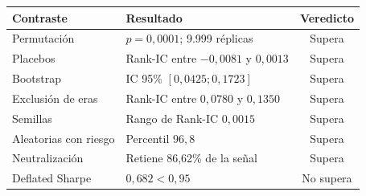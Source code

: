 \begin{tabular}{llc}
\toprule
Contraste & Resultado & Veredicto \\
\midrule
Permutación & $p=0,0001$; 9.999 réplicas & Supera \\
Placebos & Rank-IC entre $-0,0081$ y $0,0013$ & Supera \\
Bootstrap & IC 95\% $[0,0425; 0,1723]$ & Supera \\
Exclusión de eras & Rank-IC entre $0,0780$ y $0,1350$ & Supera \\
Semillas & Rango de Rank-IC $0,0015$ & Supera \\
Aleatorias con riesgo & Percentil $96,8$ & Supera \\
Neutralización & Retiene 86,62\% de la señal & Supera \\
Deflated Sharpe & $0,682 < 0,95$ & No supera \\
\bottomrule
\end{tabular}
